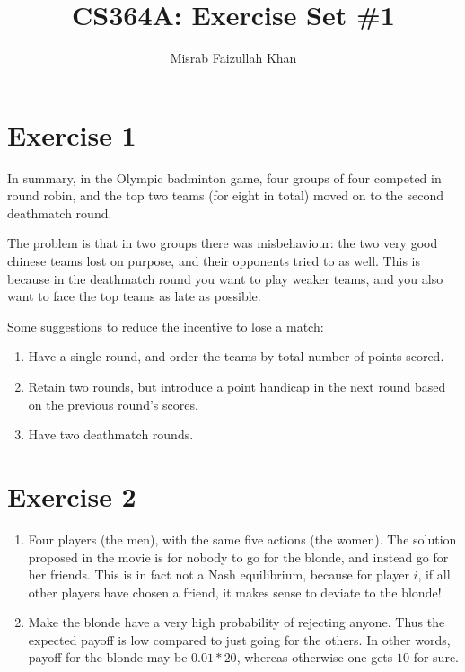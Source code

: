 \documentclass[12pt]{article}
\begin{document}
\title{CS364A: Exercise Set \#1}
\author{Misrab Faizullah Khan}

\maketitle


\section{Exercise 1}

In summary, in the Olympic badminton game, four groups of four competed in round robin, and the top two teams (for eight in total) moved on to the second deathmatch round.

The problem is that in two groups there was misbehaviour: the two very good chinese teams lost on purpose, and their opponents tried to as well. This is because in the deathmatch round you want to play weaker teams, and you also want to face the top teams as late as possible.

Some suggestions to reduce the incentive to lose a match:

\begin{enumerate}
\item Have a single round, and order the teams by total number of points scored.
\item Retain two rounds, but introduce a point handicap in the next round based on the previous round's scores.
\item Have two deathmatch rounds.
\end{enumerate}


\section{Exercise 2}

\begin{enumerate}[label=(\alph*)]

\item Four players (the men), with the same five actions (the women). The solution proposed in the movie is for nobody to go for the blonde, and instead go for her friends. This is in fact not a Nash equilibrium, because for player $i$, if all other players have chosen a friend, it makes sense to deviate to the blonde!

\item Make the blonde have a very high probability of rejecting anyone. Thus the expected payoff is low compared to just going for the others. In other words, payoff for the blonde may be $0.01 * 20$, whereas otherwise one gets $10$ for sure.

\end{enumerate}
\end{document}
